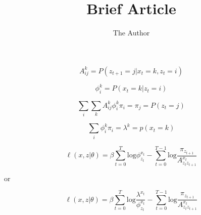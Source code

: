 \documentclass[11pt]{article}
\title{Brief Article}
\author{The Author}
\begin{document}
\maketitle

\[
A^{k}_{ij} = P(z_{t+1} = j | x_t = k, z_t = i)
\]

\[
\phi^k_i = P(x_t = k | z_t = i)
\]

\[
\sum_i \sum_k A^k_{ij} \phi^k_i \pi_i = \pi_j = P(z_t = j)
\]

\[
\sum_i \phi^k_i \pi_i = \lambda^k = p(x_t = k)
\]

\[
\ell(x,z|\theta) = \beta \sum_{t=0}^T \mathrm{log}\phi^{x_t}_{z_t} - \sum_{t=0}^{T-1} \mathrm{log}\frac{\pi_{z_{t+1}}}{A^{x_t}_{z_t z_{t+1}}}
\]

or 

\[
\ell(x,z|\theta) = \beta \sum_{t=0}^T \mathrm{log}\frac{\lambda^{x_t}}{\phi^{x_t}_{z_t}} - \sum_{t=0}^{T-1} \mathrm{log}\frac{\pi_{z_{t+1}}}{A^{x_t}_{z_t z_{t+1}}}
\]
\end{document}

